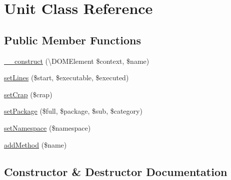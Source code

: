\hypertarget{class_sebastian_bergmann_1_1_code_coverage_1_1_report_1_1_xml_1_1_unit}{}\section{Unit Class Reference}
\label{class_sebastian_bergmann_1_1_code_coverage_1_1_report_1_1_xml_1_1_unit}
\subsection*{Public Member Functions}
\begin{DoxyCompactItemize}
\item 
\mbox{\hyperlink{class_sebastian_bergmann_1_1_code_coverage_1_1_report_1_1_xml_1_1_unit_ae8cac6187a6beca2a7d965670cf62134}{\+\_\+\+\_\+construct}} (\textbackslash{}D\+O\+M\+Element \$context, \$name)
\item 
\mbox{\hyperlink{class_sebastian_bergmann_1_1_code_coverage_1_1_report_1_1_xml_1_1_unit_a5e1b3bed5ef899d4af62739067796863}{set\+Lines}} (\$start, \$executable, \$executed)
\item 
\mbox{\hyperlink{class_sebastian_bergmann_1_1_code_coverage_1_1_report_1_1_xml_1_1_unit_acb084a3e750794ebb3ba68cb71d61d79}{set\+Crap}} (\$crap)
\item 
\mbox{\hyperlink{class_sebastian_bergmann_1_1_code_coverage_1_1_report_1_1_xml_1_1_unit_a894954592cf162fb218d4f61390cfc53}{set\+Package}} (\$full, \$package, \$sub, \$category)
\item 
\mbox{\hyperlink{class_sebastian_bergmann_1_1_code_coverage_1_1_report_1_1_xml_1_1_unit_a37949ed2c12b42fb654edc1bac8569ba}{set\+Namespace}} (\$namespace)
\item 
\mbox{\hyperlink{class_sebastian_bergmann_1_1_code_coverage_1_1_report_1_1_xml_1_1_unit_a7815f0f87575abbf6d443df8d0bc96b2}{add\+Method}} (\$name)
\end{DoxyCompactItemize}


\subsection{Constructor \& Destructor Documentation}
\mbox{\label{class_sebastian_bergmann_1_1_code_coverage_1_1_report_1_1_xml_1_1_unit_ae8cac6187a6beca2a7d965670cf62134}} 
